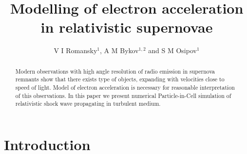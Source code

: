\documentclass[a4paper]{jpconf}
\begin{document}
\title{Modelling of electron acceleration in relativistic supernovae}

\author{V I Romansky$^{1}$, A M Bykov$^{1,2}$ and S M Osipov$^1$}

\address{$^1$ Ioffe Institute, 26 Politekhnicheskaya st., St. Petersburg 194021, Russia}
\address{$^2$ Peter the Great St.~Petersburg Polytechnic University, 29 Politekhnicheskaya st., St. Petersburg 195251, Russia}


\begin{abstract}
	Modern observations with high angle resolution of radio emission in supernova remnants show that there exists type of objects, expanding with velocities close to speed of light. Model of electron acceleration is necessary for reasonable interpretation of this observations. In this paper we present numerical Particle-in-Cell simulation of relativistic shock wave propagating in turbulent medium.
\end{abstract}
\section{Introduction}
\end{document}
